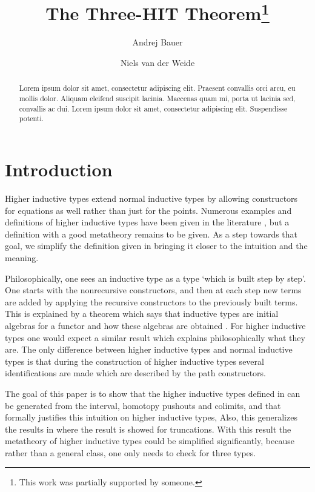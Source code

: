\documentclass[a4paper,UKenglish]{lipics-v2016}
\title{The Three-HIT Theorem\footnote{This work was partially supported by someone.}}
\author[1]{Andrej Bauer}
\author[2]{Niels van der Weide}
\affil[1]{Department of Mathematics and Physics, University of Ljubljana, Ljubljana, Slovenia\\
  \texttt{Andrej.Bauer@andrej.com}}
\affil[2]{Department of Computer Science, Radboud University, Nijmegen, The Netherlands\\
  \texttt{nweide@cs.ru.nl}}
\begin{document}
\maketitle

\begin{abstract}
Lorem ipsum dolor sit amet, consectetur adipiscing elit. Praesent convallis orci arcu, eu mollis dolor. Aliquam eleifend suscipit lacinia. Maecenas quam mi, porta ut lacinia sed, convallis ac dui. Lorem ipsum dolor sit amet, consectetur adipiscing elit. Suspendisse potenti. 
 \end{abstract}

\section{Introduction}
Higher inductive types extend normal inductive types by allowing constructors for equations as well rather than just for the points.
Numerous examples and definitions of higher inductive types have been given in the literature \cite{altenkirch2016quotient,awodey2012inductive,basoldhigher,sojakova2015higher,hottbook}, but a definition with a good metatheory remains to be given.
As a step towards that goal, we simplify the definition given in \cite{basoldhigher} bringing it closer to the intuition and the meaning.

Philosophically, one sees an inductive type as a type `which is built step by step'.
One starts with the nonrecursive constructors, and then at each step new terms are added by applying the recursive constructors to the previously built terms.
This is explained by a theorem which says that inductive types are initial algebras for a functor \cite{dybjer1994inductive,dybjer2003induction} and how these algebras are obtained \cite{adamek1974free}.
For higher inductive types one would expect a similar result which explains philosophically what they are.
The only difference between higher inductive types and normal inductive types is that during the construction of higher inductive types several identifications are made which are described by the path constructors.

The goal of this paper is to show that the higher inductive types defined in \cite{basoldhigher} can be generated from the interval, homotopy pushouts and colimits, and that formally justifies this intuition on higher inductive types, 
Also, this generalizes the results in \cite{doorn2016constructing,kraus2014general,kraus2016constructions} where the result is showed for truncations.
With this result the metatheory of higher inductive types could be simplified significantly, because rather than a general class, one only needs to check for three types.
\end{document}
